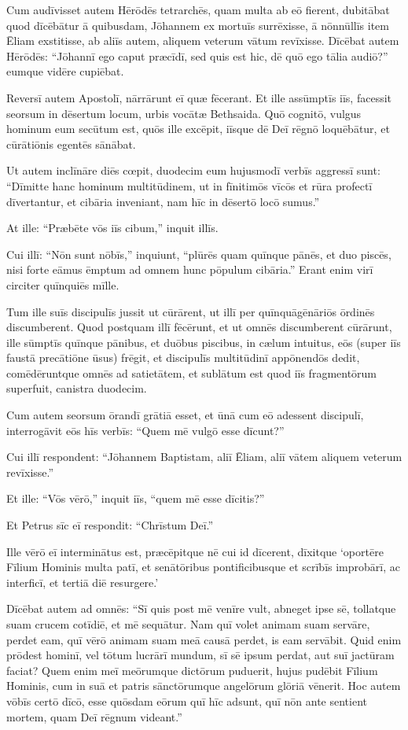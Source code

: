 \Versus Cum audīvisset autem Hērōdēs tetrarchēs, quam multa ab eō fierent, dubitābat quod dīcēbātur ā quibusdam, Jōhannem ex mortuīs surrēxisse,
\Versus ā nōnnūllīs item Ēliam exstitisse, ab aliīs autem, aliquem veterum vātum revīxisse.
\Versus Dīcēbat autem Hērōdēs: ``Jōhannī ego caput præcīdī, sed quis est hic, dē quō ego tālia audiō?'' eumque vidēre cupiēbat.

\Versus Reversī autem Apostolī, nārrārunt eī quæ fēcerant. Et ille assūmptīs iīs, facessit seorsum in dēsertum locum, urbis vocātæ Bethsaida.
\Versus Quō cognitō, vulgus hominum eum secūtum est, quōs ille excēpit, iīsque dē Deī rēgnō loquēbātur, et cūrātiōnis egentēs sānābat.

\Versus Ut autem inclīnāre diēs cœpit, duodecim eum hujusmodī verbīs aggressī sunt: ``Dīmitte hanc hominum multitūdinem, ut in fīnitimōs vīcōs et rūra profectī dīvertantur, et cibāria inveniant, nam hīc in dēsertō locō sumus.''

\Versus At ille: ``Præbēte vōs iīs cibum,'' inquit illīs.

Cui illī: ``Nōn sunt nōbīs,'' inquiunt, ``plūrēs quam quīnque pānēs, et duo piscēs, nisi forte eāmus ēmptum ad omnem hunc pōpulum cibāria.''
\Versus Erant enim virī circiter quīnquiēs mīlle.

Tum ille suīs discipulīs jussit ut cūrārent, ut illī per quīnquāgēnāriōs ōrdinēs discumberent.
\Versus Quod postquam illī fēcērunt, et ut omnēs discumberent cūrārunt,
\Versus ille sūmptīs quīnque pānibus, et duōbus piscibus, in cælum intuitus, eōs (super iīs faustā precātiōne ūsus) frēgit, et discipulīs multitūdinī appōnendōs dedit,
\Versus comēdēruntque omnēs ad satietātem, et sublātum est quod iīs fragmentōrum superfuit, canistra duodecim.

\Versus Cum autem seorsum ōrandī grātiā esset, et ūnā cum eō adessent discipulī, interrogāvit eōs hīs verbīs: ``Quem mē vulgō esse dīcunt?''

\Versus Cui illī respondent: ``Jōhannem Baptistam, aliī Ēliam, aliī vātem aliquem veterum revīxisse.''

\Versus Et ille: ``Vōs vērō,'' inquit iīs, ``quem mē esse dīcitis?''

Et Petrus sīc eī respondit: ``Chrīstum Deī.''

\Versus Ille vērō eī interminātus est, præcēpitque nē cui id dīcerent,
\Versus dīxitque `oportēre Fīlium Hominis multa patī, et senātōribus pontificibusque et scrībīs improbārī, ac interficī, et tertiā diē resurgere.'

\Versus Dīcēbat autem ad omnēs: ``Sī quis post mē venīre vult, abneget ipse sē, tollatque suam crucem cotīdiē, et mē sequātur.
\Versus Nam quī volet animam suam servāre, perdet eam, quī vērō animam suam meā causā perdet, is eam servābit.
\Versus Quid enim prōdest hominī, vel tōtum lucrārī mundum, sī sē ipsum perdat, aut suī jactūram faciat?
\Versus Quem enim meī meōrumque dictōrum puduerit, hujus pudēbit Fīlium Hominis, cum in suā et patris sānctōrumque angelōrum glōriā vēnerit.
\Versus Hoc autem vōbīs certō dīcō, esse quōsdam eōrum quī hīc adsunt, quī nōn ante sentient mortem, quam Deī rēgnum videant.''


